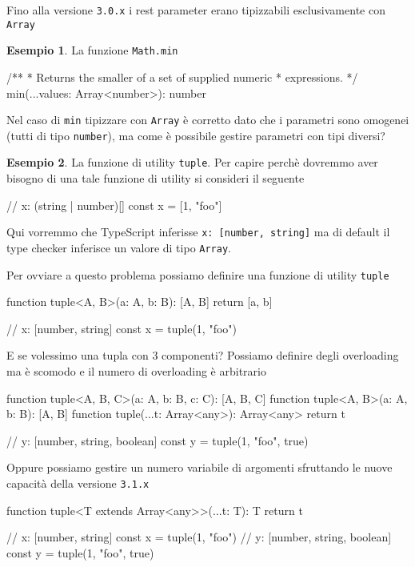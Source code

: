 \documentclass[12pt]{article}
\theoremstyle{definition}
\newtheorem{example}{Esempio}[subsection]
\newenvironment{code}
  {\vspace{0.5cm} \VerbatimEnvironment\begin{typescriptcode}}
  {\end{typescriptcode} \vspace{0.2cm}}
\begin{document}
Fino alla versione \texttt{3.0.x} i rest parameter erano tipizzabili esclusivamente con \texttt{Array}

\begin{example}
La funzione \texttt{Math.min}

\begin{code}
/**
 * Returns the smaller of a set of supplied numeric
 * expressions.
 */
min(...values: Array<number>): number
\end{code}
\end{example}

Nel caso di \texttt{min} tipizzare con \texttt{Array} è corretto dato che i parametri sono omogenei (tutti di tipo \texttt{number}),
ma come è possibile gestire parametri con tipi diversi?

\begin{example}
La funzione di utility \texttt{tuple}. Per capire perchè dovremmo aver bisogno di una tale funzione di utility si consideri il seguente

\begin{code}
// x: (string | number)[]
const x = [1, "foo"]
\end{code}

Qui vorremmo che TypeScript inferisse \texttt{x: [number, string]} ma di default il type checker inferisce un valore di tipo \texttt{Array}.

Per ovviare a questo problema possiamo definire una funzione di utility \texttt{tuple}

\begin{code}
function tuple<A, B>(a: A, b: B): [A, B] {
  return [a, b]
}

// x: [number, string]
const x = tuple(1, "foo")
\end{code}

E se volessimo una tupla con 3 componenti? Possiamo definire degli overloading ma è scomodo e il numero di overloading è arbitrario

\begin{code}
function tuple<A, B, C>(a: A, b: B, c: C): [A, B, C]
function tuple<A, B>(a: A, b: B): [A, B]
function tuple(...t: Array<any>): Array<any> {
  return t
}

// y: [number, string, boolean]
const y = tuple(1, "foo", true)
\end{code}

Oppure possiamo gestire un numero variabile di argomenti sfruttando le nuove capacità della versione \texttt{3.1.x}

\begin{code}
function tuple<T extends Array<any>>(...t: T): T {
  return t
}

// x: [number, string]
const x = tuple(1, "foo")
// y: [number, string, boolean]
const y = tuple(1, "foo", true)
\end{code}

\end{example}
\end{document}
